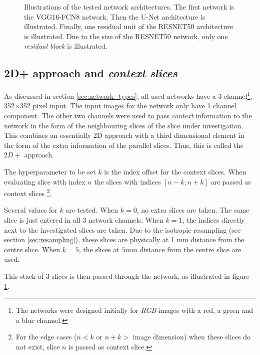 \begin{figure}
\begin{minipage}{.99\textwidth}
    \end{minipage} 
    \caption{Illustrations of the tested network architectures.
    The first network is the VGG16-FCN8 network. \newline
    Then the U-Net architecture is illustrated. \newline
    Finally, one residual unit of the RESNET50 architecture is illustrated.
    Due to the size of the RESNET50 network, only one \textit{residual block} is illustrated.
    \label{fig:vgg16}}
\end{figure}


\subsection{2D+ approach and \textit{context slices}\label{section:twoDplus}}

As discussed in section \ref{sec:network_types}, all used networks have a 3 channel\footnote{The networks were designed initially for \textit{RGB}-images with a red, a green and a blue channel.}, 
352$\times$352 pixel input. 
The input images for the network only have 1 channel component. 
The other two channels were used to pass \textit{context} information to the network in the form of the neighbouring slices of the slice under investigation.
This combines an essentially 2D approach with a third dimensional element in the form of the extra information of the parallel slices. Thus, this is called the $2D+$ approach.

The hyperparameter to be set $k$ is the index offset for the context slices.
When evaluating slice with index $n$ the slices with indices $\left[n-k; n+k\right]$ are passed as context slices
\footnote{For the edge cases ($n<k$ or $n+k>$ image dimension) when these slices do not exist, slice $n$ is passed as context slice.}.

Several values for $k$ are tested. When $k=0$, no extra slices are taken. The same slice is just entered in all 3 network channels. When $k=1$, the indices directly next to the investigated slices are taken.
Due to the isotropic resampling (see section \ref{sec:resampling}), these slices are physically at 1 mm distance from the centre slice. When $k=5$, the slices at $5 mm$ distance from the centre slice are used.

This stack of 3 slices is then passed through the network, as illustrated in figure \ref{fig:vgg16}.

